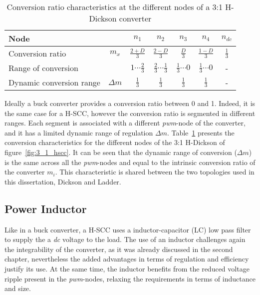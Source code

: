 \begin{table}[h]

\centering
\caption{Conversion ratio characteristics at the different nodes of a 3:1 H-Dickson converter}
\label{tab:3:1 H-Dick_M}
\renewcommand{\arraystretch}{1.5}%
\begin{tabular}{l  c | c c c c c }
 Node &  & $n_1$ & $n_2$ & $n_3$ & $n_4$ & $n_{dc}$ \\
 \midrule
 Conversion ratio & $m_x$ & $\frac{2+D}{3} $    & $\frac{2-D}{3} $ & $\frac{D}{3} $ & $\frac{1-D}{3} $ & $\frac{1}{3}$ \\
 Range of conversion &       & $1 \cdots \frac{2}{3}$ & $\frac{2}{3} \cdots \frac{1}{3} $ & $\frac{1}{3} \cdots 0$ & $\frac{1}{3} \cdots 0 $ & - \\
 Dynamic conversion range & $\Delta m$ &  $\frac{1}{3}$ &  $\frac{1}{3}$ &  $\frac{1}{3}$ &  $\frac{1}{3}$ &  -
\end{tabular}
\end{table}

Ideally a buck converter provides a conversion ratio between 0 and 1. Indeed, it is the same case for a H-SCC, however the conversion ratio is segmented in different ranges. Each segment is associated with a different \emph{pwm}-node of the converter, and it has a limited dynamic range of regulation $\Delta m$. Table~\ref{tab:3:1 H-Dick_M} presents the conversion characteristics for the different nodes of the 3:1 H-Dickson of figure~\ref{fig:3_1_hscc}. It can be seen that the dynamic range of conversion ($\Delta m$) is the same across all the \emph{pwm}-nodes and equal to the intrinsic conversion ratio of the converter $m_i$. This characteristic is shared between the two topologies used in this dissertation, Dickson and Ladder.

\subsection{Power Inductor}
\label{ch:power_inductor}

Like in a buck converter, a H-SCC uses a inductor-capacitor (LC) low pass filter to supply the a \emph{dc} voltage to the load. The use of an inductor challenges again the integrability of the converter, as it was already discussed in the second chapter, nevertheless the added advantages in terms of regulation and efficiency justify its use. At the same time, the inductor benefits from the reduced voltage ripple present in the \emph{pwm}-nodes, relaxing the requirements in terms of inductance and size.

